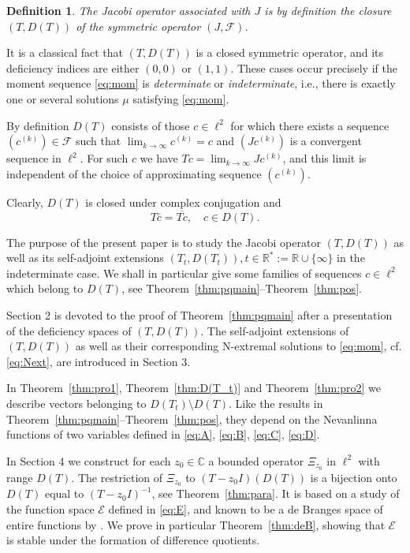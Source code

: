 \documentclass [12pt]{article}
\newtheorem{defn}[thm]{Definition}
\newcommand{\C}{\mathbb{C}}
\newcommand{\R}{\mathbb{R}}
\begin{document}
\begin{defn} The Jacobi operator associated with $J$ is by definition the closure $(T,D(T))$ of the symmetric operator $(J,\mathcal F)$.
\end{defn}

It is a classical fact that $(T,D(T))$ is a closed symmetric operator, and its deficiency indices are either $(0,0)$  or $(1,1)$. These cases occur precisely if the  moment sequence \eqref{eq:mom} is {\it determinate} or {\it indeterminate}, i.e., there is exactly one or several solutions $\mu$ satisfying \eqref{eq:mom}.   

 By definition $D(T)$ consists of those $c\in\ell^2$ for which there exists a sequence
 $(c^{(k)})\in\mathcal F$ such that $\lim_{k\to\infty}c^{(k)}=c$ and $(Jc^{(k)})$ is a convergent sequence in $\ell^2$. For  such $c$ we have $Tc=\lim_{k\to\infty} Jc^{(k)}$, and this limit is independent of the choice of approximating sequence $(c^{(k)})$. 
 
 Clearly, $D(T)$ is closed under complex conjugation and 
 $$
 T\overline{c}=\overline{Tc},\quad c\in D(T).
 $$
 
 The purpose of the present paper is to study the Jacobi operator $(T,D(T))$ as well as its self-adjoint extensions $(T_t, D(T_t)), t\in\R^*:=\R\cup\{\infty\}$ in the indeterminate case. We shall in particular give some families of sequences $c\in\ell^2$ which belong to $D(T)$, see Theorem~\ref{thm:pqmain}--Theorem~\ref{thm:pos}. 
 
 Section 2 is devoted to the proof of Theorem~\ref{thm:pqmain} after  a presentation of the deficiency spaces of $(T, D(T))$. The self-adjoint extensions of $(T, D(T))$ as well as their corresponding N-extremal solutions to \eqref{eq:mom}, cf. \eqref{eq:Next}, are introduced in Section 3. 
 
 In Theorem~\ref{thm:pro1}, Theorem~\ref{thm:D(T_t)} and Theorem~\ref{thm:pro2} we describe vectors belonging to $D(T_t)\setminus D(T)$. Like the results in Theorem~\ref{thm:pqmain}--Theorem~\ref{thm:pos}, they depend on the Nevanlinna functions of two variables defined in \eqref{eq:A},  \eqref{eq:B}, \eqref{eq:C}, \eqref{eq:D}.
 
 In Section 4 we construct for each $z_0\in\C$ a bounded operator $\Xi_{z_0}$ in $\ell^2$ with range $D(T)$. The restriction of $\Xi_{z_0}$ to $(T-z_0I)(D(T))$ is a bijection onto $D(T)$ equal to $(T-z_0I)^{-1}$, see Theorem~\ref{thm:para}. It is based
  on a study of the function space $\mathcal E$ defined in \eqref{eq:E}, and known to be a de Branges space of entire functions by \cite[Theorem 23]{Br}. We prove in particular Theorem~\ref{thm:deB}, showing that $\mathcal E$ is stable under the formation of difference quotients.
 
\end{document}
